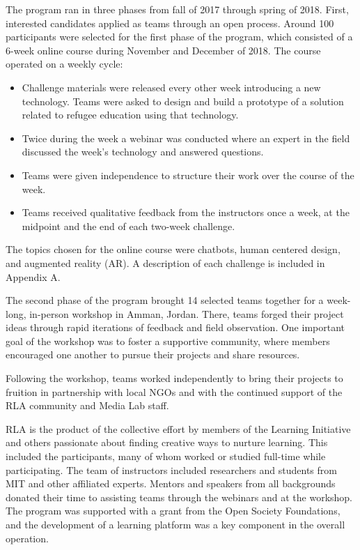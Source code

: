 \documentclass[12pt,twoside]{mitthesis}
\begin{document}
The program ran in three phases from fall of 2017 through spring of 2018. First, interested candidates applied as teams through an open process. Around 100 participants were selected for the first phase of the program, which consisted of a 6-week online course during November and December of 2018. The course operated on a weekly cycle:
\begin{itemize}
\item Challenge materials were released every other week introducing a new technology. Teams were asked to design and build a prototype of a solution related to refugee education using that technology.
\item Twice during the week a webinar was conducted where an expert in the field discussed the week's technology and answered questions.
\item Teams were given independence to structure their work over the course of the week.
\item Teams received qualitative feedback from the instructors once a week, at the midpoint and the end of each two-week challenge.
\end{itemize}
The topics chosen for the online course were chatbots, human centered design, and augmented reality (AR). A description of each challenge is included in Appendix A.

The second phase of the program brought 14 selected teams together for a week-long, in-person workshop in Amman, Jordan. There, teams forged their project ideas through rapid iterations of feedback and field observation. One important goal of the workshop was to foster a supportive community, where members encouraged one another to pursue their projects and share resources.

Following the workshop, teams worked independently to bring their projects to fruition in partnership with local NGOs and with the continued support of the RLA community and Media Lab staff.~\cite{rla}

RLA is the product of the collective effort by members of the Learning Initiative and others passionate about finding creative ways to nurture learning. This included the participants, many of whom worked or studied full-time while participating. The team of instructors included researchers and students from MIT and other affiliated experts. Mentors and speakers from all backgrounds donated their time to assisting teams through the webinars and at the workshop. The program was supported with a grant from the Open Society Foundations, and the development of a learning platform was a key component in the overall operation.
\end{document}

